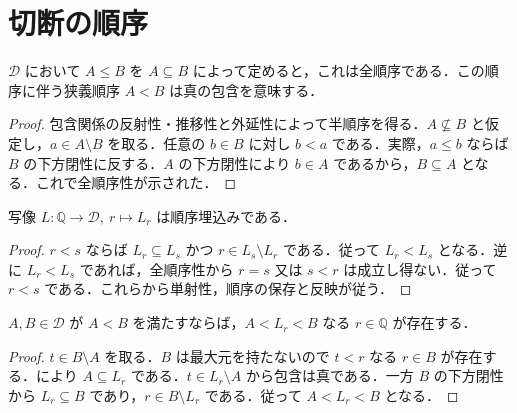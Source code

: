 \section{切断の順序}
\begin{prop}[切断の全順序]
$\mathcal D$ において $A\leq B$ を $A\subseteq B$ によって定めると，これは全順序である．この順序に伴う狭義順序 $A<B$ は真の包含を意味する．
\end{prop}
\begin{proof}
包含関係の反射性・推移性と外延性によって半順序を得る．$A\not\subseteq B$ と仮定し，$a\in A\setminus B$ を取る．任意の $b\in B$ に対し $b<a$ である．実際，$a\leq b$ ならば $B$ の下方閉性に反する．$A$ の下方閉性により $b\in A$ であるから，$B\subseteq A$ となる．これで全順序性が示された．
\end{proof}
\begin{prop}[有理数体から切断全体への順序埋込み]
写像 $L:\mathbb Q\to\mathcal D,\ r\mapsto L_r$ は順序埋込みである．
\end{prop}
\begin{proof}
$r<s$ ならば $L_r\subseteq L_s$ かつ $r\in L_s\setminus L_r$ である．従って $L_r<L_s$ となる．逆に $L_r<L_s$ であれば，全順序性から $r=s$ 又は $s<r$ は成立し得ない．従って $r<s$ である．これらから単射性，順序の保存と反映が従う．
\end{proof}
\begin{prop}[切断間の有理数の稠密性]
$A,B\in\mathcal D$ が $A<B$ を満たすならば，$A<L_r<B$ なる $r\in\mathbb Q$ が存在する．
\end{prop}
\begin{proof}
$t\in B\setminus A$ を取る．$B$ は最大元を持たないので $t<r$ なる $r\in B$ が存在する．により $A\subseteq L_r$ である．$t\in L_r\setminus A$ から包含は真である．一方 $B$ の下方閉性から $L_r\subseteq B$ であり，$r\in B\setminus L_r$ である．従って $A<L_r<B$ となる．
\end{proof}
